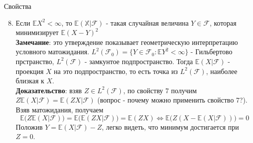 \documentclass{beamer}%
\theoremstyle{definition}
\newcommand{\F}{\mathcal{F}}
\begin{document}
\begin{frame}{Свойства}

\begin{enumerate}
\setcounter{enumi}{7}
\item Если $\mathbb{E}X^2<\infty$, то $\mathbb{E(X|\F)}$ - такая случайная величина $Y\in\F$, которая минимизирует $\mathbb{E}(X-Y)^2$
\\
\textbf{Замечание}: это утверждение показывает геометрическую интерпретацию условного матожидания. $L^2(\F_0)=\{Y\in\F_0: \mathbb{E}Y^2<\infty\}$ - Гильбертово прстранство, $L^2(\F)$ - замкунтое подпространство. Тогда $\mathbb{E}(X|\F)$ - проекция $X$ на это подпространство, то есть точка из $L^2(\F)$, наиболее близкая к $X$.
\\
\textbf{Доказательство}: взяв $Z\in L^2(\F)$, по свойству 7 получим $Z\mathbb{E}(X|\F)=\mathbb{E}(ZX|\F)$ (вопрос - почему можно применить свойство 7?). Взяв матожидания, получаем $$\mathbb{E}\big(Z\mathbb{E}(X|\F)\big)=\mathbb{E}\big(\mathbb{E}(ZX|\F)\big)=\mathbb{E}(ZX) \Leftrightarrow \mathbb{E}\big(Z(X-\mathbb{E}(X|\F))\big)=0$$
Положив $Y=\mathbb{E}(X|\F)-Z$, легко видеть, что минимум достигается при $Z=0$.
\end{enumerate}

\end{frame}
\end{document}
